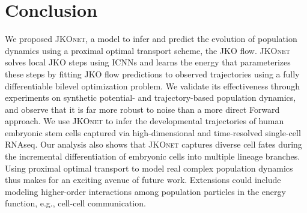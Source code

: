 \section{Conclusion}
We proposed \textsc{JKOnet}, a model to infer and predict the evolution of population dynamics using a proximal optimal transport scheme, the JKO flow.
\textsc{JKOnet} solves local JKO steps using ICNNs and learns the energy that parameterizes these steps by fitting JKO flow predictions to observed trajectories using a fully differentiable bilevel optimization problem.
We validate its effectiveness through experiments on synthetic potential- and trajectory-based population dynamics, and observe that it is far more robust to noise than a more direct Forward approach. We use \textsc{JKOnet} to infer the developmental trajectories of human embryonic stem cells captured via high-dimensional and time-resolved single-cell RNAseq. 
Our analysis also shows that \textsc{JKOnet} captures diverse cell fates during the incremental differentiation of embryonic cells into multiple lineage branches.
Using proximal optimal transport to model real complex population dynamics thus makes for an exciting avenue of future work. Extensions could include modeling higher-order interactions among population particles in the energy function, e.g., cell-cell communication.
